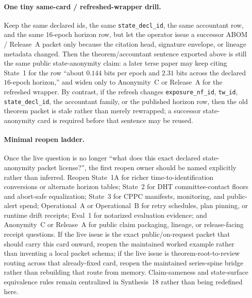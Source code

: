\documentclass[11pt]{article}
\begin{document}
\paragraph{One tiny same-card / refreshed-wrapper drill.}
Keep the same declared ids, the same \texttt{state\_decl\_id}, the same accountant row, and the same $16$-epoch horizon row, but let the operator issue a successor ABOM / Release~A packet only because the citation head, signature envelope, or lineage metadata changed.
Then the theorem/accountant sentence exported above is still the same public state-anonymity claim: a later terse paper may keep citing State~1 for the row ``about $0.144$ bits per epoch and $2.31$ bits across the declared $16$-epoch horizon,'' and widen only to Anonymity~C or Release~A for the refreshed wrapper.
By contrast, if the refresh changes \texttt{exposure\_nf\_id}, \texttt{tw\_id}, \texttt{state\_decl\_id}, the accountant family, or the published horizon row, then the old theorem packet is stale rather than merely rewrapped; a successor state-anonymity card is required before that sentence may be reused.\cite{series:abomoinl,series:release,series:planstateequiv}

\paragraph{Minimal reopen ladder.}
Once the live question is no longer ``what does this exact declared state-anonymity packet license?'', the first reopen owner should be named explicitly rather than inferred.
Reopen State~1A for richer time-to-identification conversions or alternate horizon tables; State~2 for DHT committee-contact floors and abort-safe equalization; State~3 for CPPC manifests, monitoring, and public-alert spend; Operational~A or Operational~B for retry schedules, plan pinning, or runtime drift receipts; Eval~1 for notarized evaluation evidence; and Anonymity~C or Release~A for public claim packaging, lineage, or release-facing receipt questions. If the live issue is the exact public/on-request packet that should carry this card onward, reopen the maintained worked example rather than inventing a local packet schema; if the live issue is theorem-root-to-review routing across that already-fixed card, reopen the maintained series-spine bridge rather than rebuilding that route from memory. Claim-sameness and state-surface equivalence rules remain centralized in Synthesis~18 rather than being redefined here.\cite{series:state1addendum,series:state2,series:state3,series:operationalA,series:operationalB,series:evalnotary,series:abomoinl,series:release,series:workedexample,series:seriesspines,series:planstateequiv}
\end{document}
